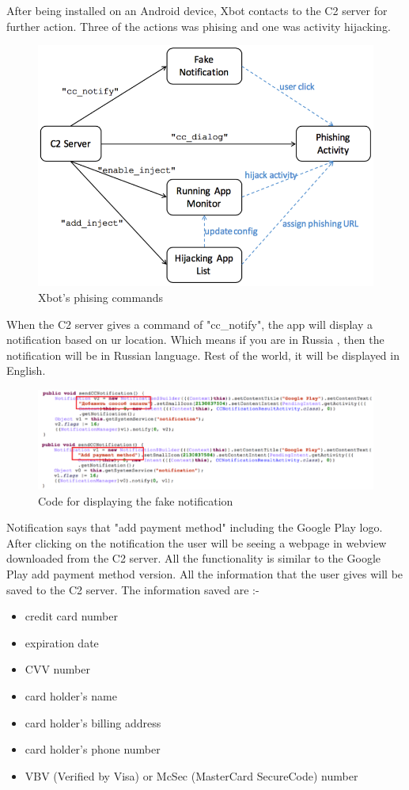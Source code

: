 After being installed on an Android device, Xbot contacts to the C2 server for further action.
Three of the actions was phising and one was activity hijacking.

\begin{figure}[H]
\centering
\includegraphics[scale=0.5]{xbot2}
\caption{Xbot's phising commands}
\label{fig:xbot2}
\end{figure}

When the C2 server gives a command of "cc\_notify", the app will display a notification based on ur location.
Which means if you are in Russia , then the notification will be in Russian language.
Rest of the world, it will be displayed in English.


\begin{figure}[H]
\centering
\includegraphics[scale=0.8]{xbot3}
\caption{Code for displaying the fake notification}
\label{fig:ra}
\end{figure}

Notification says that "add payment method" including the Google Play logo.
After clicking on the notification the user will be seeing a webpage in webview downloaded from the C2 server.
All the functionality is similar to the Google Play add payment method version.
All the information that the user gives will be saved to the C2 server.
The information saved are :-
\begin{itemize}
    \item credit card number
    \item expiration date
    \item CVV number
    \item card holder's name
    \item card holder's billing address
    \item card holder's phone number
    \item VBV (Verified by Visa) or McSec (MasterCard SecureCode) number
\end{itemize}

